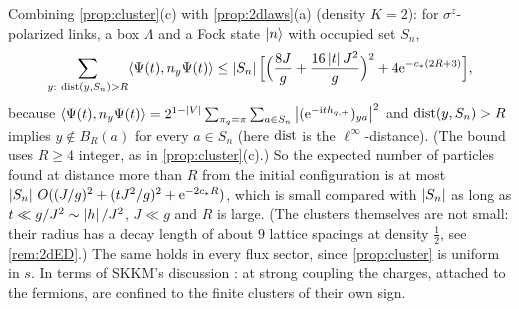 \begin{remark}\label{rem:clusterLGT}
Combining \cref{prop:cluster}(c) with \cref{prop:2dlaws}(a) (density $K=2$): for $\sigma^z$-polarized links, a
box $\Lambda$ and a Fock state $|n\rangle$ with occupied set $S_n$,
\[
  \sum_{y:\ \dist(y,S_n)>R}\langle\Psi(t),n_y\Psi(t)\rangle
  \le\abs{S_n}\Bigl[\Bigl(\frac{8J}{g}+\frac{16\abs tJ^2}{g}\Bigr)^2+4\e^{-c_*(2R+3)}\Bigr],
\]
because $\langle\Psi(t),n_y\Psi(t)\rangle=2^{1-\left|V\right|}\sum_{\pi_q=\pi}\sum_{a\in S_n}\left|(\mathrm{e}^{-\mathrm{i} th_{q,+}})_{ya}\right|^2$ and
$\operatorname{dist}(y,S_n)>R$ implies $y\notin B_R(a)$ for every $a\in S_n$ (here $\operatorname{dist}$ is the $\ell^\infty$-distance).
(The bound uses $R\ge4$ integer, as in \cref{prop:cluster}(c).)  So the expected number of particles found at
distance more than $R$ from the initial configuration is at most $\left|S_n\right|\,O((J/g)^2+(tJ^2/g)^2+\mathrm{e}^{-2c_*R})$, which
is small compared with $\left|S_n\right|$ as long as $t\ll g/J^2\sim\left|h\right|/J^2$, $J\ll g$ and $R$ is large.  (The clusters themselves are not small:
their radius has a decay length of about $9$ lattice spacings at density $\frac12$, see \cref{rem:2dED}.)  The same holds in every flux
sector, since \cref{prop:cluster} is uniform in $s$.  In terms of SKKM's discussion \cite[Sect.~I.C]{SKKM2018}:
at strong coupling the charges, attached to the fermions, are confined to the finite clusters of their own sign.
\end{remark}

